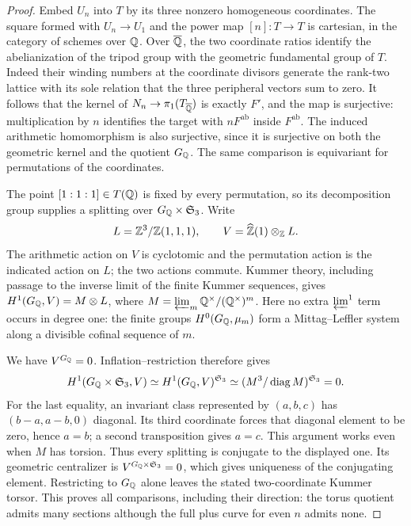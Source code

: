 \begin{proof}
Embed $U_n$ into $T$ by its three nonzero homogeneous coordinates.
The square formed with $U_n\to U_1$ and the power map
$[n]:T\to T$ is cartesian, in the category of schemes over $\mathbb Q$.
Over $\overline{\mathbb Q}$, the two coordinate ratios identify the abelianization
of the tripod group with the geometric fundamental group of $T$.
Indeed their winding numbers at the coordinate divisors generate the
rank-two lattice with its sole relation that the three peripheral
vectors sum to zero. It follows that the kernel of
$N_n\to\pi_1(T_{\overline{\mathbb Q}})$ is exactly $F'$, and the map is
surjective: multiplication by $n$ identifies the target with
$nF^{\mathrm{ab}}$ inside $F^{\mathrm{ab}}$.
The induced arithmetic homomorphism is also surjective, since it is
surjective on both the geometric kernel and the quotient $G_\mathbb Q$.
The same comparison is equivariant for permutations of the coordinates.

The point $[1:1:1]\in T(\mathbb Q)$ is fixed by every permutation, so its
decomposition group supplies a splitting over
$G_\mathbb Q\times\mathfrak S_3$. Write
\[
 L=\mathbb Z^3/\mathbb Z(1,1,1),\qquad V=\widehat{\mathbb Z}(1)\otimes_\mathbb Z L.
\]
The arithmetic action on $V$ is cyclotomic and the permutation action
is the indicated action on $L$; the two actions commute. Kummer theory,
including passage to the inverse limit of the finite Kummer sequences,
gives $H^1(G_\mathbb Q,V)=M\otimes L$, where
$M=\varprojlim_m\mathbb Q^\times/(\mathbb Q^\times)^m$.
Here no extra $\varprojlim^1$ term occurs in degree one: the finite
groups $H^0(G_\mathbb Q,\mu_m)$ form a Mittag--Leffler system along a divisible
cofinal sequence of $m$.

We have $V^{G_\mathbb Q}=0$. Inflation--restriction therefore gives
\[
 H^1(G_\mathbb Q\times\mathfrak S_3,V)
 \simeq H^1(G_\mathbb Q,V)^{\mathfrak S_3}
 \simeq (M^3/\operatorname{diag}M)^{\mathfrak S_3}=0.
\]
For the last equality, an invariant class represented by $(a,b,c)$
has $(b-a,a-b,0)$ diagonal. Its third coordinate forces that diagonal
element to be zero, hence $a=b$; a second transposition gives $a=c$.
This argument works even when $M$ has torsion. Thus every splitting
is conjugate to the displayed one. Its geometric centralizer is
$V^{G_\mathbb Q\times\mathfrak S_3}=0$, which gives uniqueness of the
conjugating element. Restricting to $G_\mathbb Q$ alone leaves the stated
two-coordinate Kummer torsor. This proves all comparisons, including
their direction: the torus quotient admits many sections although
the full plus curve for even $n$ admits none.
\end{proof}
